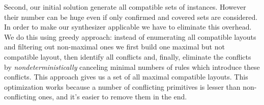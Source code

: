 %
%
%

Second, our initial solution generate all compatible sets of instances.
However their number can be huge even if only confirmed and covered sets are considered.
In order to make our synthesizer applicable we have to eliminate this overhead.
We do this using greedy approach: instead of enumerating all compatible layouts and
filtering out non-maximal ones we first build one maximal but not compatible layout, then identify all conflicts and,
finally, eliminate the conflicts by \emph{nondeterministically} canceling minimal numbers of rules which introduce these conflicts.
This approach gives us a set of all maximal compatible layouts.
This optimization works because a number of conflicting primitives is lesser than non-conflicting ones, and it's easier to remove them in the end.

